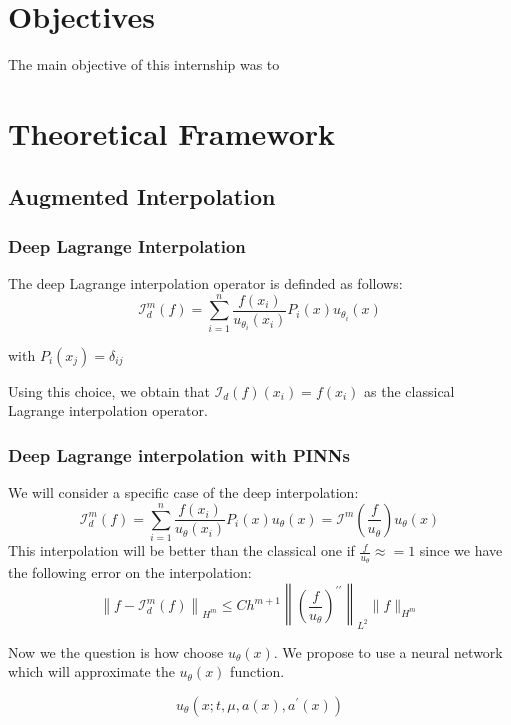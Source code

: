 \documentclass{article}
\begin{document}
\section{Objectives}
The main objective of this internship was to 


\section{Theoretical Framework}


\subsection{Augmented Interpolation}

\subsubsection{Deep Lagrange Interpolation}
The deep Lagrange interpolation operator is definded as follows:
\begin{equation*}
    \mathcal{I}_d^m(f)=\sum_{i=1}^n \frac{f\left(x_i\right)}{u_{\theta_i}\left(x_i\right)} P_i(x) u_{\theta_i}(x)
\end{equation*}

with $P_i\left(x_j\right)=\delta_{i j}$

Using this choice, we obtain that $\mathcal{I}_d(f)\left(x_i\right)=f\left(x_i\right)$ as the classical Lagrange interpolation operator. 

\subsubsection{Deep Lagrange interpolation with PINNs}

We will consider a specific case of the deep interpolation:
$$
\mathcal{I}_d^m(f)=\sum_{i=1}^n \frac{f\left(x_i\right)}{u_\theta\left(x_i\right)} P_i(x) u_\theta(x)=\mathcal{I}^m\left(\frac{f}{u_\theta}\right) u_\theta(x)
$$
This interpolation will be better than the classical one if $\frac{f}{u_\theta} \approx=1$ since we have the following error on the interpolation:
$$
\left\|f-\mathcal{I}_d^m(f)\right\|_{H^m} \leq C h^{m+1}\left\|\left(\frac{f}{u_\theta}\right)^{\prime \prime}\right\|_{L^2}\|f\|_{H^m}
$$

Now we the question is how choose $u_\theta(x)$. We propose to use a neural network which will approximate the $u_\theta(x)$ function. 

$$
u_\theta\left(x ; t, \mu, a(x), a^{\prime}(x)\right)
$$
\end{document}
